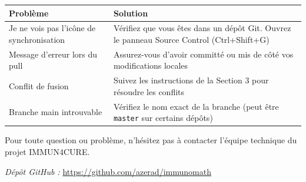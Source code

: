 \documentclass[a4paper,11pt]{article}
\begin{document}
\begin{center}
\begin{tabular}{|p{6cm}|p{8cm}|}
\hline
\textbf{Problème} & \textbf{Solution} \\
\hline
Je ne vois pas l'icône de synchronisation & Vérifiez que vous êtes dans un dépôt Git. Ouvrez le panneau Source Control (Ctrl+Shift+G) \\
\hline
Message d'erreur lors du pull & Assurez-vous d'avoir committé ou mis de côté vos modifications locales \\
\hline
Conflit de fusion & Suivez les instructions de la Section 3 pour résoudre les conflits \\
\hline
Branche main introuvable & Vérifiez le nom exact de la branche (peut être \texttt{master} sur certains dépôts) \\
\hline
\end{tabular}
\end{center}

\vspace{1cm}

\begin{tcolorbox}[colback=yellow!10,colframe=orange,title={\faPhone\ Contact}]
Pour toute question ou problème, n'hésitez pas à contacter l'équipe technique du projet IMMUN4CURE.
\end{tcolorbox}

\vspace{0.5cm}

\begin{center}
\textit{Dépôt GitHub : } \url{https://github.com/azerad/immunomath}
\end{center}
\end{document}
